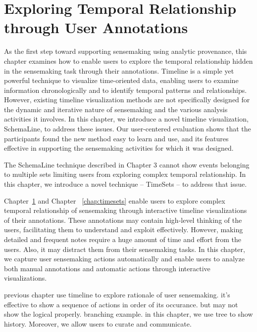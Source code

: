 \chapter{Exploring Temporal Relationship through User Annotations}
\label{chap:schemaline}

\graphicspath{{Chapter3/figures/}}
As the first step toward supporting sensemaking using analytic provenance, this chapter examines how to enable users to explore the temporal relationship hidden in the sensemaking task through their annotations. Timeline is a simple yet powerful technique to visualize time-oriented data, enabling users to examine information chronologically and to identify temporal patterns and relationships. However, existing timeline visualization methods are not specifically designed for the dynamic and iterative nature of sensemaking and the various analysis activities it involves. In this chapter, we introduce a novel timeline visualization, SchemaLine, to address these issues. Our user-centered evaluation shows that the participants found the new method easy to learn and use, and its features effective in supporting the sensemaking activities for which it was designed.

The SchemaLine technique described in Chapter 3 cannot show events belonging to multiple sets limiting users from exploring complex temporal relationship. In this chapter, we introduce a novel technique -- TimeSets -- to address that issue. 

Chapter~\ref{chap:schemaline} and Chapter ~\ref{chap:timesets} enable users to explore complex temporal relationship of sensemaking through interactive timeline visualizations of their annotations. These annotations may contain high-level thinking of the users, facilitating them to understand and exploit effectively. However, making detailed and frequent notes require a huge amount of time and effort from the users. Also, it may distract them from their sensemaking tasks. In this chapter, we capture user sensemaking actions automatically and enable users to analyze both manual annotations and automatic actions through interactive visualizations. 



previous chapter use timeline to explore rationale of user sensemaking. it's effective to show a sequence of actions in order of its occurance. but may not show the logical properly. branching example. in this chapter, we use tree to show history. Moreover, we allow users to curate and communicate. 

